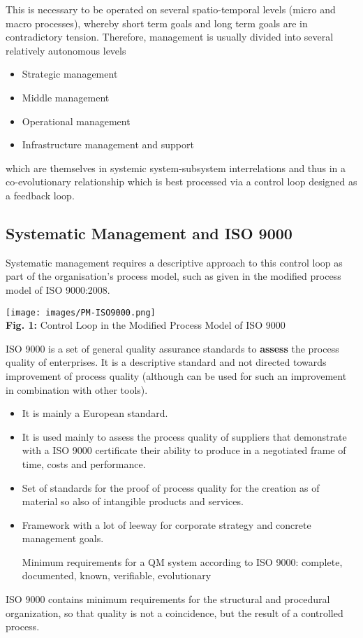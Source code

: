 \documentclass[11pt,a4paper]{article}
\begin{document}
This is necessary to be operated on several spatio-temporal levels (micro and
macro processes), whereby short term goals and long term goals are in 
contradictory tension. Therefore, management is usually divided into several
relatively autonomous levels
\begin{itemize}
\item Strategic management
\item Middle management
\item Operational management
\item Infrastructure management and support
\end{itemize}
which are themselves in systemic system-subsystem interrelations and thus in a
co-evolutio\-nary relationship which is best processed via a control loop
designed as a feedback loop.

\subsection{Systematic Management and ISO 9000}

Systematic management requires a descriptive approach to this control loop as
part of the organisation's process model, such as given in the modified
process model of ISO 9000:2008.
\begin{center}
  \texttt{[image: images/PM-ISO9000.png]}\\ \textbf{Fig. 1:}
  Control Loop in the Modified Process Model of ISO 9000
\end{center}
ISO 9000 is a set of general quality assurance standards to \textbf{assess}
the process quality of enterprises. It is a descriptive standard and not
directed towards improvement of process quality (although can be used for such
an improvement in combination with other tools).
\begin {itemize} 
\item It is mainly a European standard.
\item It is used mainly to assess the process quality of suppliers that
  demonstrate with a ISO 9000 certificate their ability to produce in a
  negotiated frame of time, costs and performance. 
\item Set of standards for the proof of process quality for the creation as of
  material so also of intangible products and services.
\item Framework with a lot of leeway for corporate strategy and concrete
  management goals.

  Minimum requirements for a QM system according to ISO 9000: complete,
  documented, known, verifiable, evolutionary
\end {itemize}
ISO 9000 contains minimum requirements for the structural and procedural
organization, so that quality is not a coincidence, but the result of a
controlled process.
\end{document}
